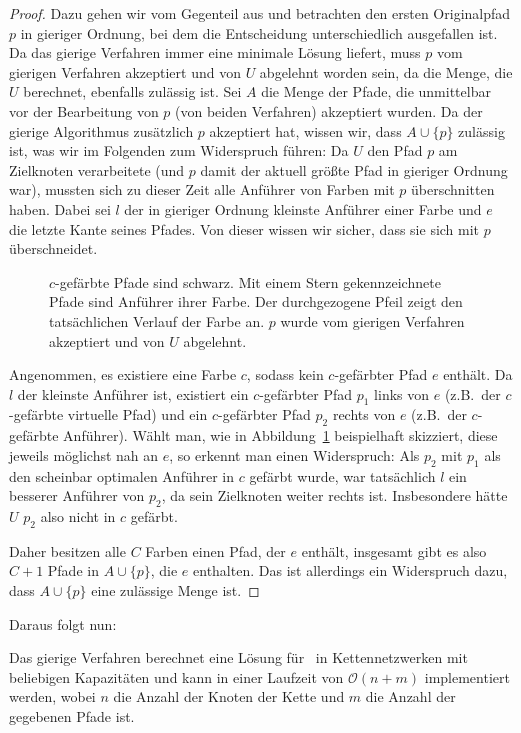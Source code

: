 \begin{proof}
    Dazu gehen wir vom Gegenteil aus und betrachten den ersten Originalpfad $p$ in gieriger Ordnung, bei dem die
    Entscheidung unterschiedlich ausgefallen ist.
    Da das gierige Verfahren immer eine minimale Lösung liefert, muss $p$ vom gierigen Verfahren akzeptiert und von
    $U$ abgelehnt worden sein, da die Menge, die $U$ berechnet, ebenfalls zulässig ist.
    Sei $A$ die Menge der Pfade, die unmittelbar vor der Bearbeitung von $p$ (von beiden Verfahren) akzeptiert wurden.
    Da der gierige Algorithmus zusätzlich $p$ akzeptiert hat, wissen wir, dass $A \cup \{p\}$ zulässig ist, was wir
    im Folgenden zum Widerspruch führen:
    Da $U$ den Pfad $p$ am Zielknoten verarbeitete (und $p$ damit der aktuell größte Pfad in gieriger Ordnung
    war), mussten sich zu dieser Zeit alle Anführer von Farben mit $p$ überschnitten haben.
    Dabei sei $l$ der in gieriger Ordnung kleinste Anführer einer Farbe und $e$ die letzte Kante seines Pfades.
    Von dieser wissen wir sicher, dass sie sich mit $p$ überschneidet.

	\begin{figure}[htbp]
		\centering
		\def\svgwidth{270bp}
		
		\caption{$c$-gefärbte Pfade sind schwarz. Mit einem Stern gekennzeichnete Pfade sind Anführer ihrer Farbe.
		Der durchgezogene Pfeil zeigt den tatsächlichen Verlauf der Farbe an. $p$ wurde vom gierigen Verfahren akzeptiert und von $U$ abgelehnt.}
		\label{fig:proof-chain-greedy-arbitrary}
	\end{figure}

    Angenommen, es existiere eine Farbe $c$, sodass kein $c$-gefärbter Pfad $e$ enthält.
    Da $l$ der kleinste Anführer ist, existiert ein $c$-gefärbter Pfad $p_1$ links von $e$ (z.B.\ der $c$-gefärbte virtuelle Pfad) und ein $c$-gefärbter Pfad $p_2$
    rechts von $e$ (z.B.\ der $c$-gefärbte Anführer).
    Wählt man, wie in Abbildung~\ref{fig:proof-chain-greedy-arbitrary} beispielhaft skizziert, diese jeweils möglichst nah an $e$, so erkennt man einen Widerspruch:
    Als $p_2$ mit $p_1$ als den scheinbar optimalen Anführer in $c$ gefärbt wurde, war tatsächlich $l$
    ein besserer Anführer von $p_2$, da sein Zielknoten weiter rechts ist.
    Insbesondere hätte $U$ $p_2$ also nicht in $c$ gefärbt.

    Daher besitzen alle $C$ Farben einen Pfad, der $e$ enthält, insgesamt gibt es also $C+1$ Pfade in $A \cup \{p\}$, die
    $e$ enthalten.
    Das ist allerdings ein Widerspruch dazu, dass $A \cup \{p\}$ eine zulässige Menge ist.
\end{proof}

Daraus folgt nun:

\begin{theorem}\label{theorem:greedyAlgorithm}
    Das gierige Verfahren berechnet eine Lösung für \CallControl\ in Kettennetzwerken mit beliebigen Kapazitäten und kann in einer Laufzeit von
    $\mathcal O(n+m)$ implementiert werden, wobei $n$ die Anzahl der Knoten der Kette und $m$ die Anzahl der gegebenen Pfade ist.
\end{theorem}
